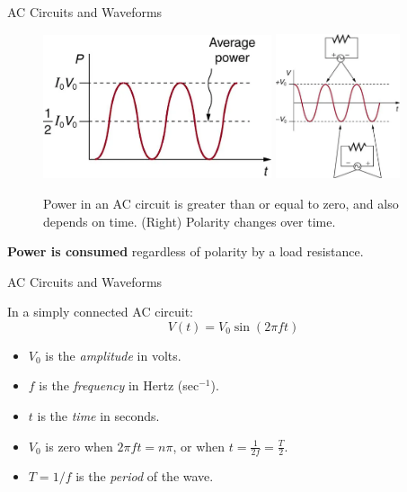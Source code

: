 \documentclass{beamer}
\begin{document}
\begin{frame}{AC Circuits and Waveforms}
\begin{figure}
\centering
\includegraphics[width=0.6\textwidth]{figures/AC_3.png}
\includegraphics[width=0.325\textwidth]{figures/AC_2.png}
\caption{\label{fig:ac_2} Power in an AC circuit is greater than  or equal to zero, and also depends on time. (Right) Polarity changes over time.}
\end{figure}
\textbf{Power is consumed} regardless of polarity by a load resistance.
\end{frame}

\begin{frame}{AC Circuits and Waveforms}
\begin{tcolorbox}[colback=white,colframe=gray,title=Components of an oscillating signal]
\alert{In a simply connected AC circuit:
\begin{equation}
V(t) = V_0 \sin(2\pi f t)
\end{equation}}
\end{tcolorbox}
\begin{itemize}
\item $V_0$ is the \textit{amplitude} in volts.
\item $f$ is the \textit{frequency} in Hertz (sec$^{-1}$).
\item $t$ is the \textit{time} in seconds.
\item $V_0$ is zero when $2\pi ft = n\pi$, or when $t = \frac{1}{2f} = \frac{T}{2}$.
\item $T = 1/f$ is the \textit{period} of the wave.
\end{itemize}
\end{frame}
\end{document}
